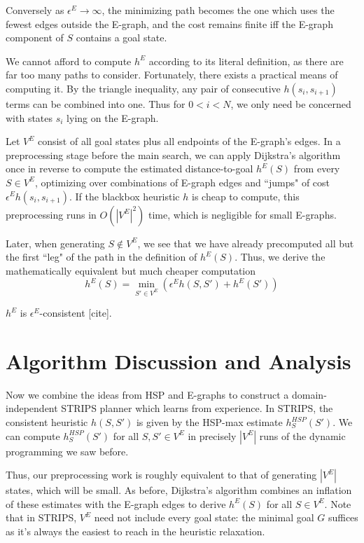 \documentclass[letterpaper]{article}
\begin{document}
Conversely as $\epsilon^E \rightarrow\infty$, the minimizing path becomes the one which uses the fewest edges outside the E-graph, and the cost remains finite iff the E-graph component of $S$ contains a goal state.

We cannot afford to compute $h^E$ according to its literal definition, as there are far too many paths to consider. Fortunately, there exists a practical means of computing it. By the triangle inequality, any pair of consecutive $h(s_i,s_{i+1})$ terms can be combined into one. Thus for $0 < i < N$, we only need be concerned with states $s_i$ lying on the E-graph.

Let $V^E$ consist of all goal states plus all endpoints of the E-graph's edges. In a preprocessing stage before the main search, we can apply Dijkstra's algorithm once in reverse to compute the estimated distance-to-goal $h^E(S)$ from every $S\in V^E$, optimizing over combinations of E-graph edges and ``jumps" of cost $\epsilon^E h(s_i,s_{i+1})$. If the blackbox heuristic $h$ is cheap to compute, this preprocessing runs in $O(|V^E|^2)$ time, which is negligible for small E-graphs.

Later, when generating $S \notin V^E$, we see that we have already precomputed all but the first ``leg" of the path in the definition of $h^E(S)$. Thus, we derive the mathematically equivalent but much cheaper computation
\[h^E(S) = \min_{S'\in V^E} \left(\epsilon^E h(S,S') + h^E(S')\right)\]

$h^E$ is $\epsilon^E$-consistent [cite].

\section{Algorithm Discussion and Analysis}

Now we combine the ideas from HSP and E-graphs to construct a domain-independent STRIPS planner which learns from experience. In STRIPS, the consistent heuristic $h(S,S')$ is given by the HSP-max estimate $h^{HSP}_S(S')$. We can compute $h^{HSP}_S(S')$ for all $S,S'\in V^E$ in precisely $|V^E|$ runs of the dynamic programming we saw before.

Thus, our preprocessing work is roughly equivalent to that of generating $|V^E|$ states, which will be small. As before, Dijkstra's algorithm combines an inflation of these estimates with the E-graph edges to derive $h^E(S)$ for all $S\in V^E$. Note that in STRIPS, $V^E$ need not include every goal state: the minimal goal $G$ suffices as it's always the easiest to reach in the heuristic relaxation.
\end{document}
